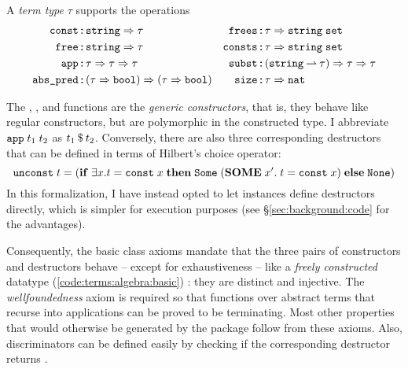 \begin{definition}
  A \emph{term type} $\tau$ supports the operations
  \begin{align*}
    \holtypejudgement{\holconst{const}&}{\holtype{string} \Rightarrow \tau} & \holtypejudgement{\holconst{frees}&}{\tau \Rightarrow \holtype{string}\;\holtype{set}} \\
    \holtypejudgement{\holconst{free}&}{\holtype{string} \Rightarrow \tau} & \holtypejudgement{\holconst{consts}&}{\tau \Rightarrow \holtype{string}\;\holtype{set}} \\
    \holtypejudgement{\holconst{app}&}{\tau \Rightarrow \tau \Rightarrow \tau} & \holtypejudgement{\holconst{subst}&}{(\holtype{string} \holmap \tau) \Rightarrow \tau \Rightarrow \tau} \\
    \holtypejudgement{\holconst{abs\_pred}&}{(\tau \Rightarrow \holtype{bool}) \Rightarrow (\tau \Rightarrow \holtype{bool})} & \holtypejudgement{\holconst{size}&}{\tau \Rightarrow \holtype{nat}}
  \end{align*}
\end{definition}

\noindent
The , , and  functions are the \emph{generic constructors}, that is, they behave like regular  constructors, but are polymorphic in the constructed type.
I abbreviate $\texttt{\textup{app}}\;t_1\;t_2$ as $t_1\mathbin{\$}t_2$.
Conversely, there are also three corresponding destructors that can be defined in terms of Hilbert's choice operator:
\[ \texttt{\textup{unconst}}\;t = (\mathtt{\mathbf{if}}\;\exists x. t = \texttt{\textup{const}}\;x \;\mathtt{\mathbf{then}}\;\texttt{\textup{Some}}\;(\mathtt{\mathbf{SOME}}\;x'.\; t = \texttt{\textup{const}}\;x)\;\mathtt{\mathbf{else}}\;\texttt{\textup{None}}) \]
In this formalization, I have instead opted to let instances define destructors directly, which is simpler for execution purposes (see §\ref{sec:background:code} for the advantages).

Consequently, the basic class axioms mandate that the three pairs of constructors and destructors behave -- except for exhaustiveness -- like a \emph{freely constructed} datatype (\cref{code:terms:algebra:basic}) \cite[§3]{blanchette2014datatypes}: they are distinct and injective.
The \emph{wellfoundedness} axiom is required so that functions over abstract terms that recurse into applications can be proved to be terminating.
Most other properties that would otherwise be generated by the  package follow from these axioms.
Also, discriminators can be defined easily by checking if the corresponding destructor returns .

